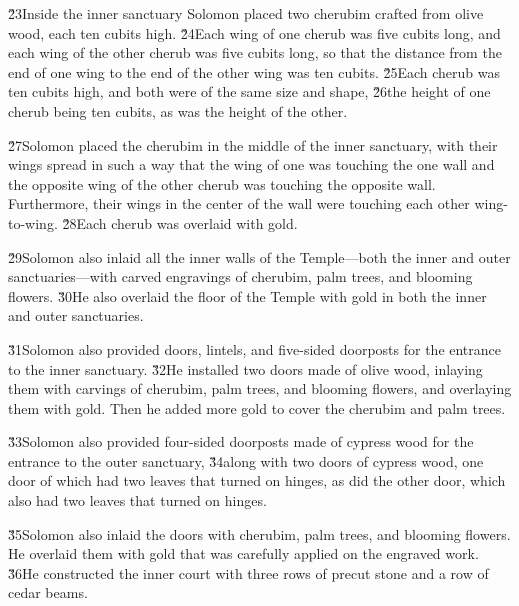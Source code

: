 \v{23}Inside the inner sanctuary Solomon placed two cherubim crafted from olive wood, each ten cubits high. \v{24}Each wing of one cherub was five cubits long, and each wing of the other cherub was five cubits long, so that the distance from the end of one wing to the end of the other wing was ten cubits. \v{25}Each cherub was ten cubits high, and both were of the same size and shape, \v{26}the height of one cherub being ten cubits, as was the height of the other.

\v{27}Solomon placed the cherubim in the middle of the inner sanctuary, with their wings spread in such a way that the wing of one was touching the one wall and the opposite wing of the other cherub was touching the opposite wall. Furthermore, their wings in the center of the wall were touching each other wing-to-wing. \v{28}Each cherub was overlaid with gold.

\v{29}Solomon also inlaid all the inner walls of the Temple---both the inner and outer sanctuaries---with carved engravings of cherubim, palm trees, and blooming flowers. \v{30}He also overlaid the floor of the Temple with gold in both the inner and outer sanctuaries.

\v{31}Solomon also provided doors, lintels, and five-sided doorposts for the entrance to the inner sanctuary. \v{32}He installed two doors made of olive wood, inlaying them with carvings of cherubim, palm trees, and blooming flowers, and overlaying them with gold. Then he added more gold to cover the cherubim and palm trees.

\v{33}Solomon also provided four-sided doorposts made of cypress wood for the entrance to the outer sanctuary, \v{34}along with two doors of cypress wood, one door of which had two leaves that turned on hinges, as did the other door, which also had two leaves that turned on hinges.

\v{35}Solomon also inlaid the doors with cherubim, palm trees, and blooming flowers. He overlaid them with gold that was carefully applied on the engraved work. \v{36}He constructed the inner court with three rows of precut stone and a row of cedar beams.

